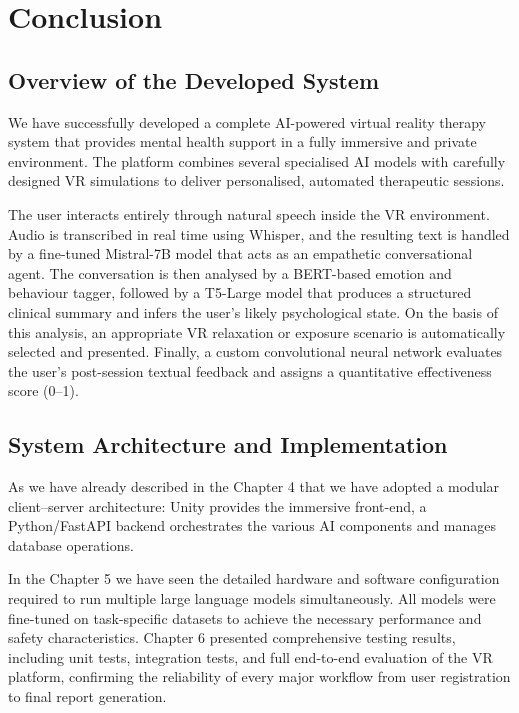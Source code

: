 \chapter{Conclusion}
\label{chap:conclusion}

\section{Overview of the Developed System}

We have successfully developed a complete AI-powered virtual reality therapy system that provides mental health support in a fully immersive and private environment. The platform combines several specialised AI models with carefully designed VR simulations to deliver personalised, automated therapeutic sessions.

The user interacts entirely through natural speech inside the VR environment. Audio is transcribed in real time using Whisper, and the resulting text is handled by a fine-tuned Mistral-7B model that acts as an empathetic conversational agent. The conversation is then analysed by a BERT-based emotion and behaviour tagger, followed by a T5-Large model that produces a structured clinical summary and infers the user’s likely psychological state. On the basis of this analysis, an appropriate VR relaxation or exposure scenario is automatically selected and presented. Finally, a custom convolutional neural network evaluates the user’s post-session textual feedback and assigns a quantitative effectiveness score (0–1).

\section{System Architecture and Implementation}

As we have already described in the Chapter 4 that we have adopted a modular client–server architecture: Unity provides the immersive front-end, a Python/FastAPI backend orchestrates the various AI components and manages database operations. 

In the Chapter 5 we have seen the detailed hardware and software configuration required to run multiple large language models simultaneously. All models were fine-tuned on task-specific datasets to achieve the necessary performance and safety characteristics. Chapter 6 presented comprehensive testing results, including unit tests, integration tests, and full end-to-end evaluation of the VR platform, confirming the reliability of every major workflow from user registration to final report generation.

